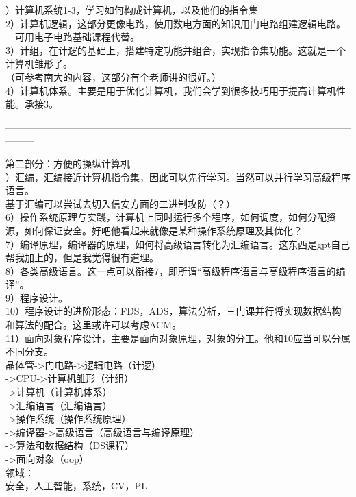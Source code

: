 \documentclass{article}
\begin{document}
）计算机系统1-3，学习如何构成计算机，以及他们的指令集\\
2）计算机逻辑，这部分更像电路，使用数电方面的知识用门电路组建逻辑电路。---可用电子电路基础课程代替。\\
3）计组，在计逻的基础上，搭建特定功能并组合，实现指令集功能。这就是一个计算机雏形了。\\
（可参考南大的内容，这部分有个老师讲的很好。）\\
4）计算机体系。主要是用于优化计算机，我们会学到很多技巧用于提高计算机性能。承接3。
\begin{center}
    ———————————————————————————————————————
\end{center}
第二部分：方便的操纵计算机\\

）汇编，汇编接近计算机指令集，因此可以先行学习。当然可以并行学习高级程序语言。\\
基于汇编可以尝试去切入信安方面的二进制攻防（？）\\
6）操作系统原理与实践，计算机上同时运行多个程序，如何调度，如何分配资源，如何保证安全。好吧他看起来就像是某种操作系统原理及其优化？\\
7）编译原理，编译器的原理，如何将高级语言转化为汇编语言。这东西是gpt自己帮我加上的，但是我觉得很有道理。\\
8）各类高级语言。这一点可以衔接7，即所谓“高级程序语言与高级程序语言的编译”。\\
9）程序设计。\\
10）程序设计的进阶形态：FDS，ADS，算法分析，三门课并行将实现数据结构和算法的配合。这里或许可以考虑ACM。\\
11）面向对象程序设计，主要是面向对象原理，对象的分工。他和10应当可以分属不同分支。\\

\noindent
晶体管->门电路->逻辑电路（计逻）\\
->CPU->计算机雏形（计组）\\
->计算机（计算机体系）\\

\noindent
->汇编语言（汇编语言）\\
->操作系统（操作系统原理）\\
->编译器->高级语言（高级语言与编译原理）\\
->算法和数据结构（DS课程）\\
->面向对象（oop）\\

\noindent
领域：\\
安全，人工智能，系统，CV，PL\\
\end{document}
